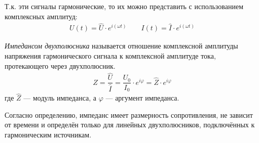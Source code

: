 \documentclass[a4paper, usenames, dvipsnames]{article}
\begin{document}
Т.к. эти сигналы гармонические,
то их можно представить с использованием комплексных амплитуд:
\begin{gather*}
    U(t) = \hat{U} \cdot e^{i(\omega t)} \hspace{2em} I(t) = \hat{I} \cdot e^{i(\omega t)}
\end{gather*}

{\it Импедансом двухполюсника} называется отношение комплексной амплитуды напряжения
гармонического сигнала к комплексной амплитуде тока, протекающего через двухполюсник.
\begin{gather*}
    Z = \dfrac{\hat{U}}{\hat{I}} = \dfrac{U_0}{I_0} \cdot e^{i\varphi} = \hat{Z} \cdot e^{i\varphi}
\end{gather*}
где $\hat{Z}$ --- модуль импеданса, а $\varphi$ --- аргумент импеданса.

Согласно определению, импеданс имеет размерность сопротивления,
не зависит от времени и определён только для линейных двухполюсников,
подключённых к гармоническим источникам.
\end{document}
